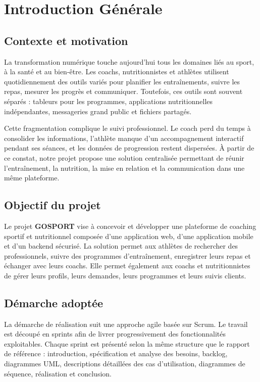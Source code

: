 \chapter*{Introduction Générale}

\section*{Contexte et motivation}
La transformation numérique touche aujourd'hui tous les domaines liés au sport, à la santé et au bien-être. Les coachs, nutritionnistes et athlètes utilisent quotidiennement des outils variés pour planifier les entraînements, suivre les repas, mesurer les progrès et communiquer. Toutefois, ces outils sont souvent séparés : tableurs pour les programmes, applications nutritionnelles indépendantes, messageries grand public et fichiers partagés.

Cette fragmentation complique le suivi professionnel. Le coach perd du temps à consolider les informations, l'athlète manque d'un accompagnement interactif pendant ses séances, et les données de progression restent dispersées. À partir de ce constat, notre projet propose une solution centralisée permettant de réunir l'entraînement, la nutrition, la mise en relation et la communication dans une même plateforme.

\section*{Objectif du projet}
Le projet \textbf{GOSPORT} vise à concevoir et développer une plateforme de coaching sportif et nutritionnel composée d'une application web, d'une application mobile et d'un backend sécurisé. La solution permet aux athlètes de rechercher des professionnels, suivre des programmes d'entraînement, enregistrer leurs repas et échanger avec leurs coachs. Elle permet également aux coachs et nutritionnistes de gérer leurs profils, leurs demandes, leurs programmes et leurs suivis clients.

\section*{Démarche adoptée}
La démarche de réalisation suit une approche agile basée sur Scrum. Le travail est découpé en sprints afin de livrer progressivement des fonctionnalités exploitables. Chaque sprint est présenté selon la même structure que le rapport de référence : introduction, spécification et analyse des besoins, backlog, diagrammes UML, descriptions détaillées des cas d'utilisation, diagrammes de séquence, réalisation et conclusion.

